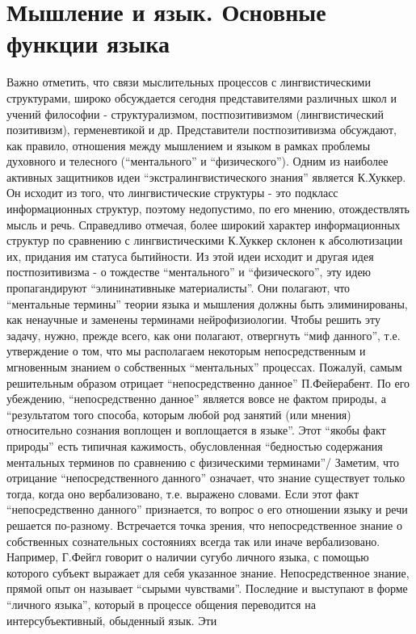 \documentclass[12pt]{article}
\begin{document}
\newpage
\section{Мышление и язык. Основные функции языка}
Важно отметить, что связи мыслительных процессов с лингвистическими структурами, широко обсуждается
сегодня представителями различных школ и учений философии - структурализмом, постпозитивизмом
(лингвистический позитивизм), герменевтикой и др. Представители постпозитивизма обсуждают, как правило,
отношения между мышлением и языком в рамках проблемы духовного и телесного (“ментального” и
“физического”). Одним из наиболее активных защитников идеи “экстралингвистического знания” является
К.Хуккер. Он исходит из того, что лингвистические структуры - это подкласс информационных структур,
поэтому недопустимо, по его мнению, отождествлять мысль и речь. Справедливо отмечая, более широкий
характер информационных структур по сравнению с лингвистическими К.Хуккер склонен к абсолютизации их,
придания им статуса бытийности. Из этой идеи исходит и другая идея постпозитивизма - о тождестве
“ментального” и “физического”, эту идею пропагандируют “элининативныке материалисты”. Они полагают,
что “ментальные термины” теории языка и мышления должны быть элиминированы, как ненаучные и заменены
терминами нейрофизиологии. Чтобы решить эту задачу, нужно, прежде всего, как они полагают, отвергнуть
“миф данного”, т.е. утверждение о том, что мы располагаем некоторым непосредственным и мгновенным
знанием о собственных “ментальных” процессах. Пожалуй, самым решительным образом отрицает
“непосредственно данное” П.Фейерабент. По его убеждению, “непосредственно данное” является вовсе не
фактом природы, а “результатом того способа, которым любой род занятий (или мнения) относительно сознания
воплощен и воплощается в языке”. Этот “якобы факт природы” есть типичная кажимость, обусловленная
“бедностью содержания ментальных терминов по сравнению с физическими терминами”/
Заметим, что отрицание “непосредственного данного” означает, что знание существует только тогда, когда оно
вербализовано, т.е. выражено словами. Если этот факт “непосредственно данного” признается, то вопрос о его
отношении языку и речи решается по-разному. Встречается точка зрения, что непосредственное знание о
собственных сознательных состояниях всегда так или иначе вербализовано. Например, Г.Фейгл говорит о
наличии сугубо личного языка, с помощью которого субъект выражает для себя указанное знание.
Непосредственное знание, прямой опыт он называет “сырыми чувствами”. Последние и выступают в форме
“личного языка”, который в процессе общения переводится на интерсубъективный, обыденный язык. Эти
\end{document}
